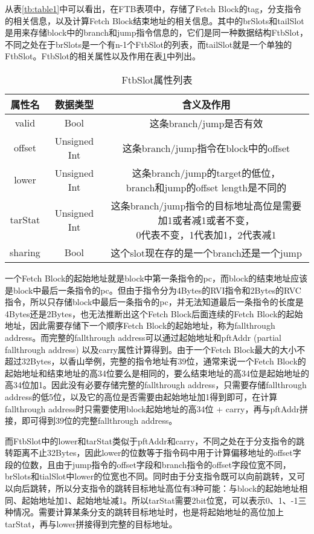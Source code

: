 从表\ref{tb:table1}中可以看出，在FTB表项中，存储了Fetch Block的tag，分支指令的相关信息，以及计算Fetch Block结束地址的相关信息。其中的brSlots和tailSlot是用来存储block中的branch和jump指令信息的，它们是同一种数据结构FtbSlot，不同之处在于brSlots是一个有n-1个FtbSlot的列表，而tailSlot就是一个单独的FtbSlot。FtbSlot的相关属性以及作用在表\ref{tb:table2}中列出。

\begin{table}[]
	\caption{FtbSlot属性列表}
	\label{tb:table2}
	\centering
	\begin{tabular}{|c|c|c|}
		\hline
		属性名   & 数据类型   & 含义及作用   \\ \hline
		valid & Bool & 这条branch/jump是否有效 \\ \hline
		offset & Unsigned Int & 这条branch/jump指令在block中的offset \\ \hline
		lower & Unsigned Int & \tabincell{c}{这条branch/jump的target的低位， \\ branch和jump的offset length是不同的} \\ \hline
		tarStat & Unsigned Int & \tabincell{c}{这条branch/jump指令的目标地址高位是需要加1或者减1或者不变， \\ 0代表不变，1代表加1，2代表减1} \\ \hline
		sharing & Bool & 这个slot现在存的是一个branch还是一个jump \\ \hline
	\end{tabular}
\end{table}

一个Fetch Block的起始地址就是block中第一条指令的pc，而block的结束地址应该是block中最后一条指令的pc。但由于指令分为4Bytes的RVI指令和2Bytes的RVC指令，所以只存储block中最后一条指令的pc，并无法知道最后一条指令的长度是4Bytes还是2Bytes，也无法推断出这个Fetch Block后面连续的Fetch Block的起始地址，因此需要存储下一个顺序Fetch Block的起始地址，称为fallthrough address。而完整的fallthrough address可以通过起始地址和pftAddr (partial fallthrough address) 以及carry属性计算得到。由于一个Fetch Block最大的大小不超过32Bytes，以香山举例，完整的指令地址有39位，通常来说一个Fetch Block的起始地址和结束地址的高34位要么是相同的，要么结束地址的高34位是起始地址的高34位加1。因此没有必要存储完整的fallthrough address，只需要存储fallthrough address的低5位，以及它的高位是否需要由起始地址加1得到即可，在计算fallthrough address时只需要使用block起始地址的高34位 + carry，再与pftAddr拼接，即可得到39位的完整fallthrough address。

而FtbSlot中的lower和tarStat类似于pftAddr和carry，不同之处在于分支指令的跳转距离不止32Bytes，因此lower的位数等于指令码中用于计算偏移地址的offset字段的位数，且由于jump指令的offset字段和branch指令的offset字段位宽不同，brSlots和tialSlot中lower的位宽也不同。同时由于分支指令既可以向前跳转，又可以向后跳转，所以分支指令的跳转目标地址高位有3种可能：与block的起始地址相同、起始地址加1、起始地址减1。所以tarStat需要2bit位宽，可以表示0、1、-1三种情况。需要计算某条分支的跳转目标地址时，也是将起始地址的高位加上tarStat，再与lower拼接得到完整的目标地址。

